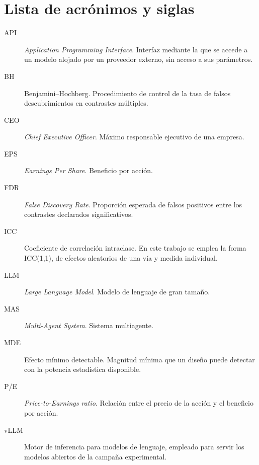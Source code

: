 

\chapter*{Lista de acrónimos y siglas}

\begin{description}
	
	\item[API] \textit{Application Programming Interface}. Interfaz mediante la
	que se accede a un modelo alojado por un proveedor externo, sin acceso a sus
	parámetros.
	
	\item[BH] Benjamini--Hochberg. Procedimiento de control de la tasa de falsos
	descubrimientos en contrastes múltiples.
	
	\item[CEO] \textit{Chief Executive Officer}. Máximo responsable ejecutivo de
	una empresa.
	
	\item[EPS] \textit{Earnings Per Share}. Beneficio por acción.
	
	\item[FDR] \textit{False Discovery Rate}. Proporción esperada de falsos
	positivos entre los contrastes declarados significativos.
	
	\item[ICC] Coeficiente de correlación intraclase. En este trabajo se emplea
	la forma ICC(1,1), de efectos aleatorios de una vía y medida individual.
	
	\item[LLM] \textit{Large Language Model}. Modelo de lenguaje de gran tamaño.
	
	\item[MAS] \textit{Multi-Agent System}. Sistema multiagente.
	
	\item[MDE] Efecto mínimo detectable. Magnitud mínima que un diseño puede
	detectar con la potencia estadística disponible.
	
	\item[P/E] \textit{Price-to-Earnings ratio}. Relación entre el precio de la
	acción y el beneficio por acción.
	
	\item[vLLM] Motor de inferencia para modelos de lenguaje, empleado para
	servir los modelos abiertos de la campaña experimental.
	
\end{description}

